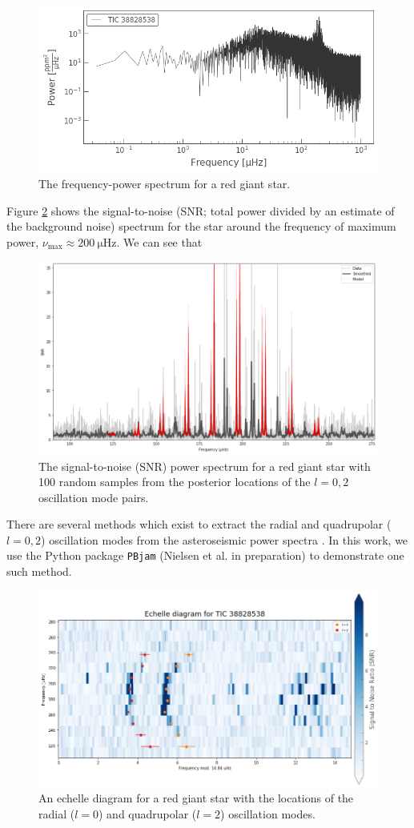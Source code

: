 \begin{figure}
    \centering
    \includegraphics[width=0.8\linewidth]{introduction/images/sprectrum.png}
    \caption{The frequency-power spectrum for a red giant star.}
    \label{fig:spec}
\end{figure}

Figure \ref{fig:peakbag} shows the signal-to-noise (SNR; total power divided by an estimate of the background noise) spectrum for the star around the frequency of maximum power, $\nu_\mathrm{max} \approx \SI{200}{\micro\hertz}$. We can see that  

\begin{figure}
    \centering
    \includegraphics[width=0.8\linewidth]{introduction/images/peakbag.png}
    \caption{The signal-to-noise (SNR) power spectrum for a red giant star with 100 random samples from the posterior locations of the $l=0,2$ oscillation mode pairs.}
    \label{fig:peakbag}
\end{figure}

There are several methods which exist to extract the radial and quadrupolar ($l=0, 2$) oscillation modes from the asteroseismic power spectra \citep[see e.g.][]{Mosser.Belkacem.ea2011, Appourchaux.Chaplin.ea2012, Davies.Aguirre.ea2016}. In this work, we use the Python package \texttt{PBjam} (Nielsen et al. in preparation) to demonstrate one such method.

\begin{figure}
    \centering
    \includegraphics[width=0.8\linewidth]{introduction/images/echelle.png}
    \caption{An echelle diagram for a red giant star with the locations of the radial ($l=0$) and quadrupolar ($l=2$) oscillation modes.}
    \label{fig:echelle}
\end{figure}
